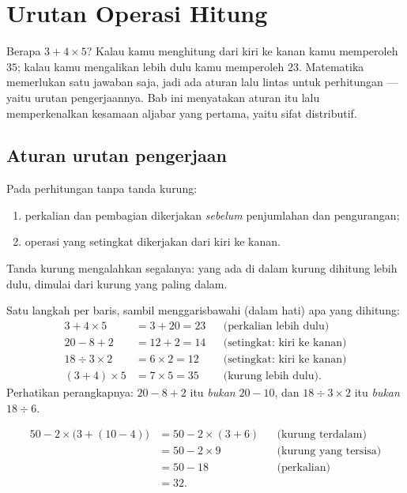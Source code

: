 \chapter{Urutan Operasi Hitung}\label{ch:g7:priorities}

Berapa $3 + 4 \times 5$? Kalau kamu menghitung dari kiri ke kanan kamu
memperoleh $35$; kalau kamu mengalikan lebih dulu kamu memperoleh
$23$. Matematika memerlukan satu jawaban saja, jadi ada aturan lalu
lintas untuk perhitungan --- yaitu urutan pengerjaannya. Bab ini
menyatakan aturan itu lalu memperkenalkan kesamaan aljabar yang
pertama, yaitu sifat distributif.

\section{Aturan urutan pengerjaan}

\begin{theorem}\label{thm:g7:priorities:rules}
Pada perhitungan tanpa tanda kurung:
\begin{enumerate}
  \item perkalian dan pembagian dikerjakan \emph{sebelum} penjumlahan
        dan pengurangan;
  \item operasi yang setingkat dikerjakan dari kiri ke kanan.
\end{enumerate}
Tanda kurung mengalahkan segalanya: yang ada di dalam kurung dihitung
lebih dulu, dimulai dari kurung yang paling dalam.
\end{theorem}

\begin{example}\label{ex:g7:priorities:basic}
Satu langkah per baris, sambil menggarisbawahi (dalam hati) apa yang dihitung:
\begin{align*}
3 + 4 \times 5 &= 3 + 20 = 23
&&\text{(perkalian lebih dulu)}\\
20 - 8 + 2 &= 12 + 2 = 14
&&\text{(setingkat: kiri ke kanan)}\\
18 \div 3 \times 2 &= 6 \times 2 = 12
&&\text{(setingkat: kiri ke kanan)}\\
(3 + 4) \times 5 &= 7 \times 5 = 35
&&\text{(kurung lebih dulu).}
\end{align*}
Perhatikan perangkapnya: $20 - 8 + 2$ itu \emph{bukan} $20 - 10$, dan
$18 \div 3 \times 2$ itu \emph{bukan} $18 \div 6$.
\end{example}

\begin{example}\label{ex:g7:priorities:nested}
\begin{align*}
50 - 2 \times \bigl(3 + (10 - 4)\bigr)
&= 50 - 2 \times (3 + 6) && \text{(kurung terdalam)}\\
&= 50 - 2 \times 9 && \text{(kurung yang tersisa)}\\
&= 50 - 18 && \text{(perkalian)}\\
&= 32 .
\end{align*}
\end{example}

